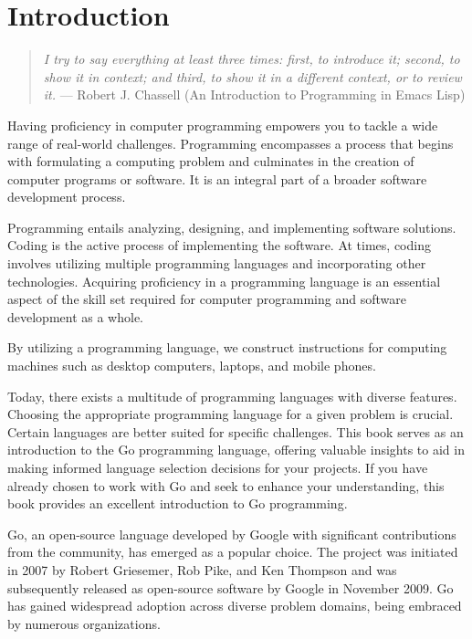 \cleardoublepage
{}
\chapter{Introduction}

\begin{quote}
\textit{I try to say everything at least three times: first, to
introduce it; second, to show it in context; and third, to show it in a
different context, or to review it.} --- Robert J. Chassell (An Introduction to
Programming in Emacs Lisp)
\end{quote}

Having proficiency in computer programming empowers you to tackle a wide range
of real-world challenges. Programming encompasses a process that begins with
formulating a computing problem and culminates in the creation of computer
programs or software. It is an integral part of a broader software development
process.

Programming entails analyzing, designing, and implementing software solutions.
Coding is the active process of implementing the software. At times, coding
involves utilizing multiple programming languages and incorporating other
technologies. Acquiring proficiency in a programming language is an essential
aspect of the skill set required for computer programming and software
development as a whole.

By utilizing a programming language, we construct instructions for computing
machines such as desktop computers, laptops, and mobile phones.

Today, there exists a multitude of programming languages with diverse features.
Choosing the appropriate programming language for a given problem is crucial.
Certain languages are better suited for specific challenges. This book serves as
an introduction to the Go programming language, offering valuable insights to
aid in making informed language selection decisions for your projects. If you
have already chosen to work with Go and seek to enhance your understanding, this
book provides an excellent introduction to Go programming.

Go, an open-source language developed by Google with significant contributions
from the community, has emerged as a popular choice. The project was initiated
in 2007 by Robert Griesemer, Rob Pike, and Ken Thompson and was subsequently
released as open-source software by Google in November 2009. Go has gained
widespread adoption across diverse problem domains, being embraced by numerous
organizations.

